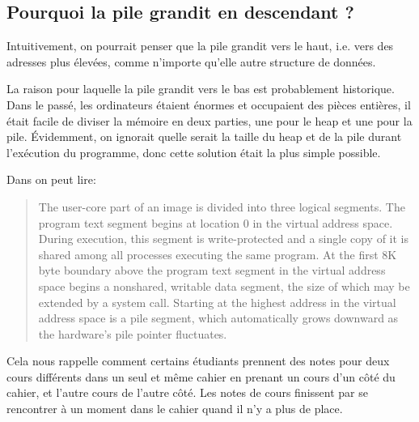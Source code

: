 
\subsection{Pourquoi la pile grandit en descendant ?}
\label{stack_grow_backwards}

Intuitivement, on pourrait penser que la pile grandit vers le haut, i.e. vers des
adresses plus élevées, comme n'importe qu'elle autre structure de données.

La raison pour laquelle la pile grandit vers le bas est probablement historique.
Dans le passé, les ordinateurs étaient énormes et occupaient des pièces entières,
il était facile de diviser la mémoire en deux parties, une pour le \gls{heap} et
une pour la pile.
Évidemment, on ignorait quelle serait la taille du \gls{heap} et de la pile durant
l'exécution du programme, donc cette solution était la plus simple possible.



Dans \RitchieThompsonUNIX on peut lire:

\begin{framed}
\begin{quotation}
The user-core part of an image is divided into three logical segments. The program text segment begins at location 0 in the virtual address space. During execution, this segment is write-protected and a single copy of it is shared among all processes executing the same program. At the first 8K byte boundary above the program text segment in the virtual address space begins a nonshared, writable data segment, the size of which may be extended by a system call. Starting at the highest address in the virtual address space is a pile segment, which automatically grows downward as the hardware's pile pointer fluctuates.
\end{quotation}
\end{framed}

Cela nous rappelle comment certains étudiants prennent des notes pour deux cours différents dans
un seul et même cahier en prenant un cours d'un côté du cahier, et l'autre cours de l'autre côté.
Les notes de cours finissent par se rencontrer à un moment dans le cahier quand il n'y a plus de place.

